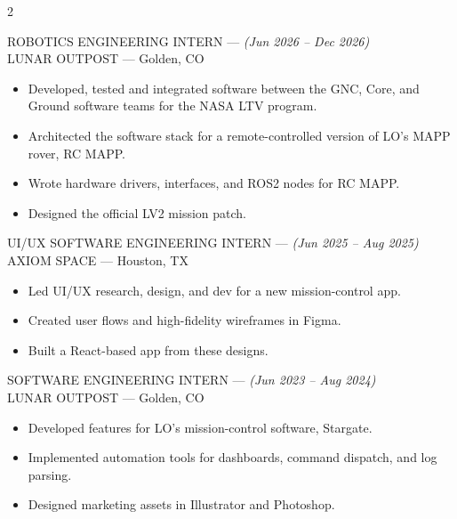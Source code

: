 \documentclass[10pt,letterpaper,ragged2e,withhyper]{altacv}
\newcommand{\experience}[4]{
  \textcolor{subheading}{\MakeUppercase{#1}} \hspace{0.2cm}--- \hspace{0.2cm} \emph{(#2)}\\
  {\MakeUppercase{#3}} \hspace{0.2cm}---\hspace{0.2cm}   #4
  \vspace{4pt}  %
}
\begin{document}
\begin{paracol}{2}
\begin{leftcolumn}
\end{leftcolumn}

\switchcolumn


\experience
  {Robotics Engineering Intern}
  {Jun 2026 – Dec 2026}
  {Lunar Outpost}
  {Golden, CO}
\begin{itemize}
  \item Developed, tested and integrated software between the GNC, Core, and Ground software teams for the NASA LTV program.
  \item Architected the software stack for a remote-controlled version of LO's MAPP rover, RC MAPP.
  \item Wrote hardware drivers, interfaces, and ROS2 nodes for RC MAPP.
  \item Designed the official LV2 mission patch.
\end{itemize}

\divider

\experience
  {UI/UX Software Engineering Intern}
  {Jun 2025 – Aug 2025}
  {Axiom Space}
  {Houston, TX}
\begin{itemize}
  \item Led UI/UX research, design, and dev for a new mission-control app.
  \item Created user flows and high-fidelity wireframes in Figma.
  \item Built a React-based app from these designs.
\end{itemize}

\divider

\experience
  {Software Engineering Intern}
  {Jun 2023 – Aug 2024}
  {Lunar Outpost}
  {Golden, CO}
\begin{itemize}
  \item Developed features for LO's mission-control software, Stargate.
  \item Implemented automation tools for dashboards, command dispatch, and log parsing.
  \item Designed marketing assets in Illustrator and Photoshop.
\end{itemize}


\end{paracol}
\end{document}
